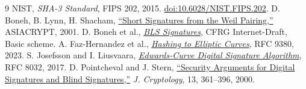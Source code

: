 \documentclass[10pt,twocolumn,letterpaper]{article}
\begin{document}
\begin{thebibliography}{9}\small
{} NIST, \emph{SHA-3 Standard}, FIPS 202, 2015. \href{https://doi.org/10.6028/NIST.FIPS.202}{doi:10.6028/NIST.FIPS.202}.
 D. Boneh, B. Lynn, H. Shacham, \href{https://crypto.stanford.edu/~dabo/pubs/abstracts/weilsigs.html}{``Short Signatures from the Weil Pairing,''} ASIACRYPT, 2001.
 D. Boneh et al., \href{https://datatracker.ietf.org/doc/draft-irtf-cfrg-bls-signature/}{\emph{BLS Signatures}}, CFRG Internet-Draft, Basic scheme.
 A. Faz-Hernandez et al., \href{https://www.rfc-editor.org/rfc/rfc9380}{\emph{Hashing to Elliptic Curves}}, RFC 9380, 2023.
 S. Josefsson and I. Liusvaara, \href{https://www.rfc-editor.org/rfc/rfc8032}{\emph{Edwards-Curve Digital Signature Algorithm}}, RFC 8032, 2017.
 D. Pointcheval and J. Stern, \href{https://www.di.ens.fr/david.pointcheval/Documents/Papers/2000_joc.pdf}{``Security Arguments for Digital Signatures and Blind Signatures,''} \emph{J. Cryptology}, 13, 361--396, 2000.
\end{thebibliography}
\end{document}
